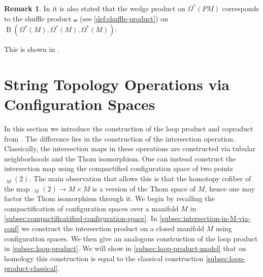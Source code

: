 \documentclass{scrartcl}
\theoremstyle{plain}
\theoremstyle{definition}
\newtheorem{remark}[theorem]{Remark}
\DeclareMathOperator{\BC}{B}
\DeclareMathOperator{\cConf}{\overline{Conf}}
\begin{document}
\begin{remark}
    In \cite{naef2019string} it is also stated that the wedge product on $\Omega^*(PM)$ corresponds to the shuffle product $\shuffle$ (see \cref{def:shuffle-product}) on $\BC(\Omega^*(M), \Omega^*(M), \Omega^*(M))$:
    \begin{center}
    \end{center}
    This is shown in \cite[4.1]{chen1973iterated}.

\end{remark}





\section{String Topology Operations via Configuration Spaces}\label{sec:string-ops-via-cfg-spaces}

In this section we introduce the construction of the loop product and coproduct from \cite{naef2019string}. The difference lies in the construction of the intersection operation. Classically, the intersection maps in these operations are constructed via tubular neighborhoods and the Thom isomorphism. One can instead construct the intersection map using the compactified configuration space of two points $\cConf_M(2)$. The main observation that allows this is that the homotopy cofiber of the map $\cConf_M(2)\to M\times M$ is a version of the Thom space of $M$, hence one may factor the Thom isomorphism through it. We begin by recalling the compactification of configuration spaces over a manifold $M$ in \cref{subsec:compactificatified-configuration-space}. In \cref{subsec:intersection-in-M-via-conf} we construct the intersection product on a closed manifold $M$ using configuration spaces. We then give an analogous construction of the loop product in \cref{subsec:loop-product}. We will show in \ref{subsec:loop-product-model} that on homology this construction is equal to the classical construction \ref{subsec:loop-product-classical}. 
\end{document}
